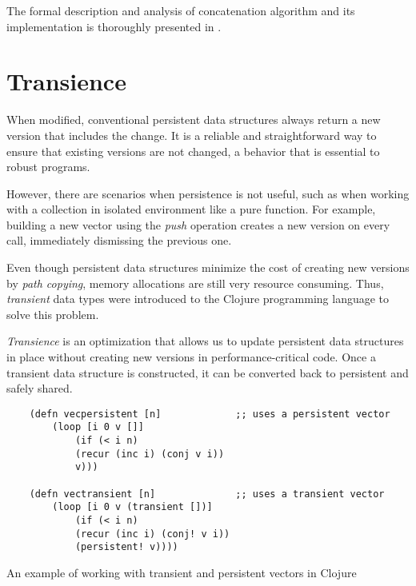 The formal description and analysis of concatenation algorithm and its implementation is thoroughly presented in \cite{improving-performance-through-transience}.

\section{Transience}
\label{sec:transience}

When modified, conventional persistent data structures always return a new version that includes the change. It is a reliable and straightforward way to ensure that existing versions are not changed, a behavior that is essential to robust programs.

However, there are scenarios when persistence is not useful, such as when working with a collection in isolated environment like a pure function. For example, building a new vector using the \emph{push} operation creates a new version on every call, immediately dismissing the previous one.

Even though persistent data structures minimize the cost of creating new versions by \emph{path copying}, memory allocations are still very resource consuming. Thus, \emph{transient} data types were introduced to the Clojure programming language to solve this problem.

\emph{Transience} is an optimization that allows us to update persistent data structures in place without creating new versions in performance-critical code. Once a transient data structure is constructed, it can be converted back to persistent and safely shared.

\begin{listing}[!ht]

    \centering
    \begin{verbatim}
    (defn vecpersistent [n]             ;; uses a persistent vector
        (loop [i 0 v []]
            (if (< i n)
            (recur (inc i) (conj v i))
            v)))

    (defn vectransient [n]              ;; uses a transient vector
        (loop [i 0 v (transient [])]
            (if (< i n)
            (recur (inc i) (conj! v i))
            (persistent! v))))
    \end{verbatim}

    \caption{An example of working with transient and persistent vectors in Clojure}
    \label{lst:clojure-vector-example}
\end{listing}

